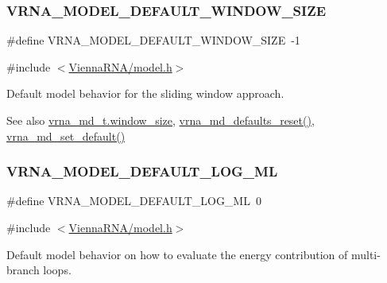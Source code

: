 \subsubsection{\texorpdfstring{V\+R\+N\+A\+\_\+\+M\+O\+D\+E\+L\+\_\+\+D\+E\+F\+A\+U\+L\+T\+\_\+\+W\+I\+N\+D\+O\+W\+\_\+\+S\+I\+ZE}{VRNA\_MODEL\_DEFAULT\_WINDOW\_SIZE}}
{\footnotesize\ttfamily \#define V\+R\+N\+A\+\_\+\+M\+O\+D\+E\+L\+\_\+\+D\+E\+F\+A\+U\+L\+T\+\_\+\+W\+I\+N\+D\+O\+W\+\_\+\+S\+I\+ZE~-\/1}



{\ttfamily \#include $<$\hyperlink{model_8h}{Vienna\+R\+N\+A/model.\+h}$>$}



Default model behavior for the sliding window approach. 

\begin{DoxySeeAlso}{See also}
\hyperlink{group__model__details_abea42f9229f8d8d6bcbedef316315bfc}{vrna\+\_\+md\+\_\+t.\+window\+\_\+size}, \hyperlink{group__model__details_ga70834424cf804d149937de89f80ceb45}{vrna\+\_\+md\+\_\+defaults\+\_\+reset()}, \hyperlink{group__model__details_ga8ac6ff84936282436f822644bf841f66}{vrna\+\_\+md\+\_\+set\+\_\+default()} 
\end{DoxySeeAlso}
\mbox{\label{group__model__details_ga938f68463e84fe060aa6502f428a517d}} 
\subsubsection{\texorpdfstring{V\+R\+N\+A\+\_\+\+M\+O\+D\+E\+L\+\_\+\+D\+E\+F\+A\+U\+L\+T\+\_\+\+L\+O\+G\+\_\+\+ML}{VRNA\_MODEL\_DEFAULT\_LOG\_ML}}
{\footnotesize\ttfamily \#define V\+R\+N\+A\+\_\+\+M\+O\+D\+E\+L\+\_\+\+D\+E\+F\+A\+U\+L\+T\+\_\+\+L\+O\+G\+\_\+\+ML~0}



{\ttfamily \#include $<$\hyperlink{model_8h}{Vienna\+R\+N\+A/model.\+h}$>$}



Default model behavior on how to evaluate the energy contribution of multi-\/branch loops. 

